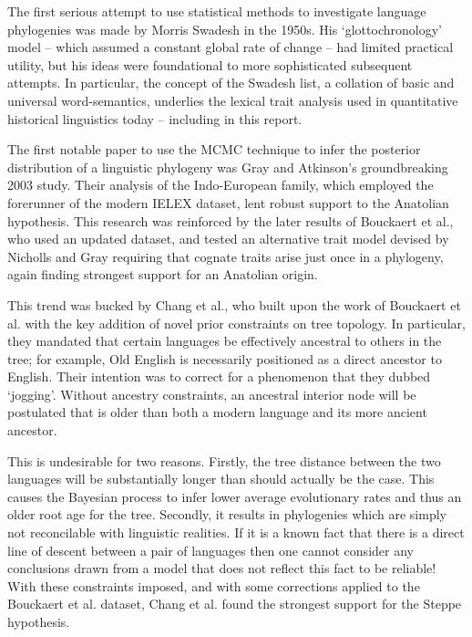 \documentclass[10pt,journal,compsoc]{IEEEtran}
\begin{document}
The first serious attempt to use statistical methods to investigate language phylogenies was made by Morris Swadesh in the 1950s. His `glottochronology' model -- which assumed a constant global rate of change -- had limited practical utility, but his ideas were foundational to more sophisticated subsequent attempts\cite{swadesh1955towards}. In particular, the concept of the Swadesh list, a collation of basic and universal word-semantics, underlies the lexical trait analysis used in quantitative historical linguistics today -- including in this report.

The first notable paper to use the MCMC technique to infer the posterior distribution of a linguistic phylogeny was Gray and Atkinson's groundbreaking 2003 study. Their analysis of the Indo-European family, which employed the forerunner of the modern IELEX dataset, lent robust support to the Anatolian hypothesis.\cite{gray2003language} This research was reinforced by the later results of Bouckaert et al.\cite{bouckaert2012mapping}\cite{bouckaert2013correction}, who used an updated dataset, and tested an alternative trait model devised by Nicholls and Gray\cite{nicholls2008dated} requiring that cognate traits arise just once in a phylogeny, again finding strongest support for an Anatolian origin.

This trend was bucked by Chang et al., who built upon the work of Bouckaert et al. with the key addition of novel prior constraints on tree topology.\cite{chang2015ancestry} In particular, they mandated that certain languages be effectively ancestral to others in the tree; for example, Old English is necessarily positioned as a direct ancestor to English. Their intention was to correct for a phenomenon that they dubbed `jogging'. Without ancestry constraints, an ancestral interior node will be postulated that is older than both a modern language and its more ancient ancestor.

This is undesirable for two reasons. Firstly, the tree distance between the two languages will be substantially longer than should actually be the case. This causes the Bayesian process to infer lower average evolutionary rates and thus an older root age for the tree. Secondly, it results in phylogenies which are simply not reconcilable with linguistic realities. If it is a known fact that there is a direct line of descent between a pair of languages then one cannot consider any conclusions drawn from a model that does not reflect this fact to be reliable! With these constraints imposed, and with some corrections applied to the Bouckaert et al. dataset, Chang et al. found the strongest support for the Steppe hypothesis.
\end{document}

